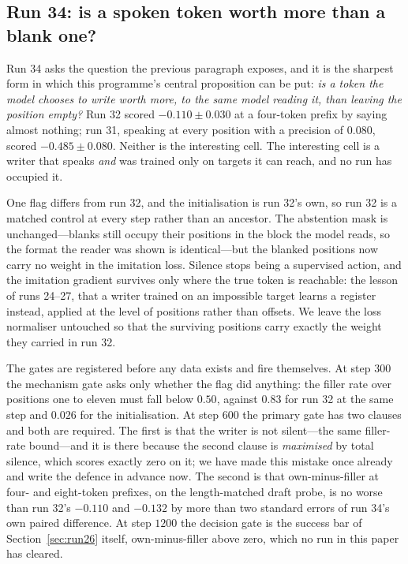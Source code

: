 \documentclass{article} %
\begin{document}
\subsection{Run 34: is a spoken token worth more than a blank one?}
\label{sec:run34}

Run 34 asks the question the previous paragraph exposes, and it is the sharpest form in which
this programme's central proposition can be put: \emph{is a token the model chooses to write
worth more, to the same model reading it, than leaving the position empty?} Run 32 scored
$-0.110 \pm 0.030$ at a four-token prefix by saying almost nothing; run 31, speaking at every
position with a precision of $0.080$, scored $-0.485 \pm 0.080$. Neither is the interesting
cell. The interesting cell is a writer that speaks \emph{and} was trained only on targets it
can reach, and no run has occupied it.

One flag differs from run 32, and the initialisation is run 32's own, so run 32 is a matched
control at every step rather than an ancestor. The abstention mask is unchanged---blanks still
occupy their positions in the block the model reads, so the format the reader was shown is
identical---but the blanked positions now carry no weight in the imitation loss. Silence stops
being a supervised action, and the imitation gradient survives only where the true token is
reachable: the lesson of runs 24--27, that a writer trained on an impossible target learns a
register instead, applied at the level of positions rather than offsets. We leave the loss
normaliser untouched so that the surviving positions carry exactly the weight they carried in
run 32.

The gates are registered before any data exists and fire themselves. At step $300$ the
mechanism gate asks only whether the flag did anything: the filler rate over positions one to
eleven must fall below $0.50$, against $0.83$ for run 32 at the same step and $0.026$ for the
initialisation. At step $600$ the primary gate has two clauses and both are required. The
first is that the writer is not silent---the same filler-rate bound---and it is there because
the second clause is \emph{maximised} by total silence, which scores exactly zero on it; we
have made this mistake once already and write the defence in advance now. The second is that
own-minus-filler at four- and eight-token prefixes, on the length-matched draft probe, is no
worse than run 32's $-0.110$ and $-0.132$ by more than two standard errors of run 34's own
paired difference. At step $1200$ the decision gate is the success bar of Section~\ref{sec:run26}
itself, own-minus-filler above zero, which no run in this paper has cleared.
\end{document}
